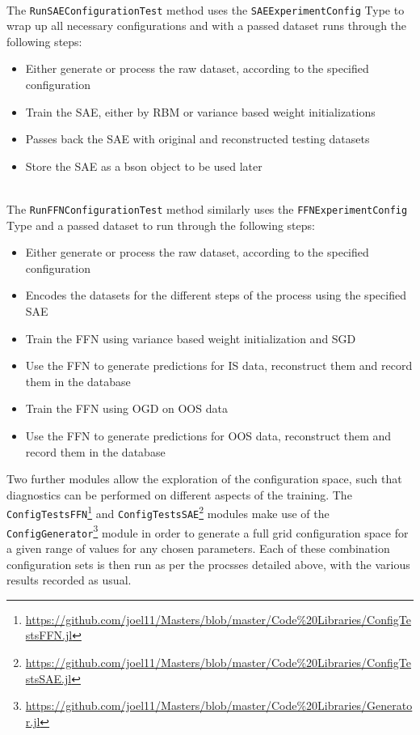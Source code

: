 \documentclass[a4paper,11pt,oneside]{article}
\theoremstyle{plain}
\theoremstyle{definition}
\begin{document}
	~\\
	The \texttt{RunSAEConfigurationTest} method uses the \texttt{SAEExperimentConfig} Type to wrap up all necessary configurations and with a passed dataset runs through the following steps:
	\begin{itemize}
		\item[1] Either generate or process the raw dataset, according to the specified configuration
		\item[2] Train the SAE, either by RBM or variance based weight initializations
		\item[3] Passes back the SAE with original and reconstructed testing datasets
		\item[4] Store the SAE as a bson object to be used later
	\end{itemize}
	
	~\\
	The \texttt{RunFFNConfigurationTest} method similarly uses the \texttt{FFNExperimentConfig} Type and a passed dataset to run through the following steps:
	\begin{itemize}
		\item[1] Either generate or process the raw dataset, according to the specified configuration
		\item[2] Encodes the datasets for the different steps of the process using the specified SAE
		\item[3] Train the FFN using variance based weight initialization and SGD
		\item[4] Use the FFN to generate predictions for IS data, reconstruct them and record them in the database
		\item[5] Train the FFN using OGD on OOS data
		\item[6] Use the FFN to generate predictions for OOS data, reconstruct them and record them in the database
	\end{itemize}
	
	Two further modules allow the exploration of the configuration space, such that diagnostics can be performed on different aspects of the training. 	The \texttt{ConfigTestsFFN}\footnote{\url{https://github.com/joel11/Masters/blob/master/Code\%20Libraries/ConfigTestsFFN.jl}} and \texttt{ConfigTestsSAE}\footnote{\url{https://github.com/joel11/Masters/blob/master/Code\%20Libraries/ConfigTestsSAE.jl}} modules make use of the \texttt{ConfigGenerator}\footnote{\url{https://github.com/joel11/Masters/blob/master/Code\%20Libraries/Generator.jl}} module in order to generate a full grid configuration space for a given range of values for any chosen parameters. Each of these combination configuration sets is then run as per the procsses detailed above, with the various results recorded as usual. 
	
\end{document}
